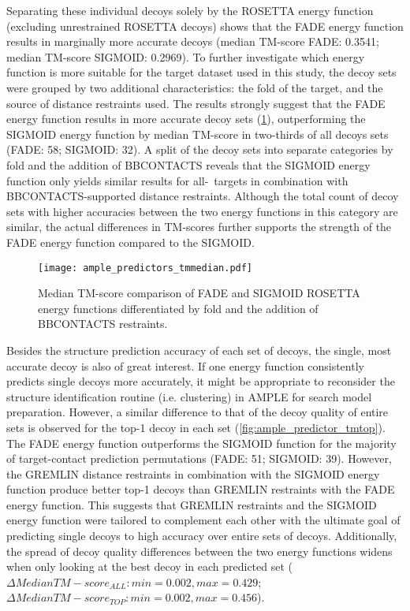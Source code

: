 Separating these individual decoys solely by the ROSETTA energy function (excluding unrestrained ROSETTA decoys) shows that the FADE energy function results in marginally more accurate decoys (median TM-score FADE: 0.3541; median TM-score SIGMOID: 0.2969). To further investigate which energy function is more suitable for the target dataset used in this study, the decoy sets were grouped by two additional characteristics: the fold of the target, and the source of distance restraints used. The results strongly suggest that the FADE energy function results in more accurate decoy sets (\cref{fig:ample_predictor_tmmedian}), outperforming the SIGMOID energy function by median TM-score in two-thirds of all decoys sets (FADE: 58; SIGMOID: 32). A split of the decoy sets into separate categories by fold and the addition of BBCONTACTS reveals that the SIGMOID energy function only yields similar results for all-\textbeta\ targets in combination with BBCONTACTS-supported distance restraints. Although the total count of decoy sets with higher accuracies between the two energy functions in this category are similar, the actual differences in TM-scores further supports the strength of the FADE energy function compared to the SIGMOID.

\begin{figure}[H]
    \centering
    \texttt{[image: ample\_predictors\_tmmedian.pdf]}
    \caption{Median TM-score comparison of FADE and SIGMOID ROSETTA energy functions differentiated by fold and the addition of BBCONTACTS restraints.}
    \label{fig:ample_predictor_tmmedian}
\end{figure}

Besides the structure prediction accuracy of each set of decoys, the single, most accurate decoy is also of great interest. If one energy function consistently predicts single decoys more accurately, it might be appropriate to reconsider the structure identification routine (i.e. clustering) in AMPLE for search model preparation. However, a similar difference to that of the decoy quality of entire sets is observed for the top-1 decoy in each set (\cref{fig:ample_predictor_tmtop}). The FADE energy function outperforms the SIGMOID function for the majority of target-contact prediction permutations (FADE: 51; SIGMOID: 39). However, the GREMLIN distance restraints in combination with the SIGMOID energy function produce better top-1 decoys than GREMLIN restraints with the FADE energy function. This suggests that GREMLIN restraints and the SIGMOID energy function were tailored to complement each other with the ultimate goal of predicting single decoys to high accuracy over entire sets of decoys. Additionally, the spread of decoy quality differences between the two energy functions widens when only looking at the best decoy in each predicted set ($\Delta Median TM-score_{ALL}: min=0.002, max=0.429$; $\Delta Median TM-score_{TOP}: min=0.002, max=0.456$). 

